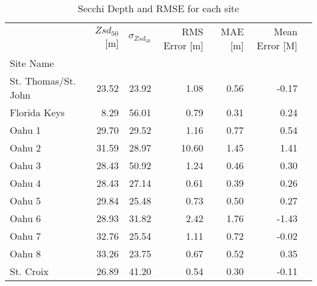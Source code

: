 \begin{table}
    \centering
    \caption{Secchi Depth and RMSE for each site}
    \label{tab:ocean_color_summary_by_site}
    \begin{tabular}{lrrrrrr}
        \toprule
        {}                  & $Zsd_{50}$[m] & $\sigma_{Zsd_{50}}$ & RMS Error [m] & MAE [m] & Mean Error [M] \\
        Site Name           &               &                        &               &         &                \\
        \midrule
        St. Thomas/St. John & 23.52         & 23.92                  & 1.08          & 0.56    & -0.17          \\
        Florida Keys        & 8.29          & 56.01                  & 0.79          & 0.31    & 0.24           \\
        Oahu 1              & 29.70         & 29.52                  & 1.16          & 0.77    & 0.54           \\
        Oahu 2              & 31.59         & 28.97                  & 10.60         & 1.45    & 1.41           \\
        Oahu 3              & 28.43         & 50.92                  & 1.24          & 0.46    & 0.30           \\
        Oahu 4              & 28.43         & 27.14                  & 0.61          & 0.39    & 0.26           \\
        Oahu 5              & 29.84         & 25.48                  & 0.73          & 0.50    & 0.27           \\
        Oahu 6              & 28.93         & 31.82                  & 2.42          & 1.76    & -1.43          \\
        Oahu 7              & 32.76         & 25.54                  & 1.11          & 0.72    & -0.02          \\
        Oahu 8              & 33.26         & 23.75                  & 0.67          & 0.52    & 0.35           \\
        St. Croix           & 26.89         & 41.20                  & 0.54          & 0.30    & -0.11          \\
        \bottomrule
    \end{tabular}
\end{table}
